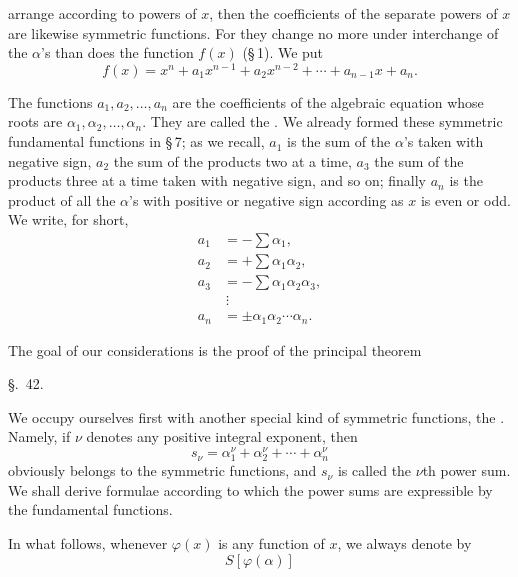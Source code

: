 
arrange according to powers of $x$, then the coefficients of the separate powers of $x$ are likewise symmetric functions. For they change no more under interchange of the $\alpha$'s than does the function $f(x)$ (\S\,1). We put
\begin{equation}
 f(x)=x^n+a_1x^{n-1}+a_2x^{n-2}+\cdots+a_{n-1}x+a_n.
\tag{2}
\end{equation}

The functions $a_1,a_2,\ldots,a_n$ are the coefficients of the algebraic equation whose roots are $\alpha_1,\alpha_2,\ldots,\alpha_n$. They are called the . We already formed these symmetric fundamental functions in \S\,7; as we recall, $a_1$ is the sum of the $\alpha$'s taken with negative sign, $a_2$ the sum of the products two at a time, $a_3$ the sum of the products three at a time taken with negative sign, and so on; finally $a_n$ is the product of all the $\alpha$'s with positive or negative sign according as $x$ is even or odd.
We write, for short,
\begin{equation}
\begin{aligned}
 a_1&=-\sum \alpha_1,\\
 a_2&=+\sum \alpha_1\alpha_2,\\
 a_3&=-\sum \alpha_1\alpha_2\alpha_3,\\
 &\ \vdots\\
 a_n&=\pm \alpha_1\alpha_2\cdots\alpha_n.
\end{aligned}
\tag{3}
\end{equation}

The goal of our considerations is the proof of the principal theorem 

\begin{center}
{\large \S.\ 42.}

\vspace{0.5em}
{\large{}}
\end{center}

We occupy ourselves first with another special kind of symmetric functions, the . Namely, if $\nu$ denotes any positive integral exponent, then
\begin{equation}
 s_\nu=\alpha_1^\nu+\alpha_2^\nu+\cdots+\alpha_n^\nu
\tag{1}
\end{equation}
obviously belongs to the symmetric functions, and $s_\nu$ is called the $\nu$th power sum. We shall derive formulae according to which the power sums are expressible by the fundamental functions.

In what follows, whenever $\varphi(x)$ is any function of $x$, we always denote by
\[
 S[\varphi(\alpha)]
\]
